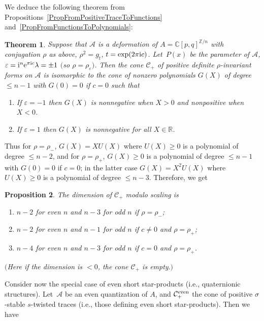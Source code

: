 \documentclass[pdftex]{sigma}
\newcommand{\RN}{\mathbb{R}} %
\newcommand{\CN}{\mathbb{C}} %
\newcommand{\mc}[1]{\mathcal{#1}}
\newtheorem{Theorem}{Theorem}[section]
\newtheorem{Proposition}[Theorem]{Proposition}
\theoremstyle{definition}
\numberwithin{equation}{section}
\begin{document}
We deduce the following theorem from Propositions~\ref{PropFromPositiveTraceToFunctions} and~\ref{PropFromFunctionsToPolynomials}:
\begin{Theorem}
\label{ThrPositiveFormSmallerThanOne}
Suppose that $\mc{A}$ is a deformation of $A=\CN[p,q]^{\mathbb Z/n}$ with conjugation $\rho$ as above, $\rho^2=g_t$, $t=\exp(2\pi {\rm i} c)$. Let~$P(x)$ be the parameter of $\mc{A}$, $\varepsilon={\rm i}^n{\rm e}^{\pi {\rm i}c}\lambda=\pm 1$ $($so $\rho=\rho_\varepsilon)$. Then the cone $\mc C_+$ of positive definite $\rho$-invariant forms on $\mc{A}$ is isomorphic to the cone of nonzero polynomials $G(X)$ of degree $\le n-1$ with $G(0)=0$ if $c=0$ such that
\begin{enumerate}\itemsep=0pt
\item[$1.$] If $\varepsilon=-1$ then $G(X)$ is nonnegative when $X>0$ and nonpositive when $X<0$.
\item[$2.$] If $\varepsilon=1$ then $G(X)$ is nonnegative for all $X\in \RN$.
\end{enumerate}
\end{Theorem}

Thus for $\rho=\rho_-$, $G(X)=XU(X)$ where $U(X)\ge 0$ is a polynomial of degree $\le n-2$, and for $\rho=\rho_+$, $G(X)\ge 0$ is a polynomial of degree $\le n-1$ with $G(0)=0$ if $c=0$; in the latter case $G(X)=X^2U(X)$ where $U(X)\ge 0$ is a polynomial of degree $\le n-3$. Therefore, we get

\begin{Proposition} The dimension of $\mc C_+$ modulo scaling is
\begin{enumerate}\itemsep=0pt
\item[$\bullet$] $n-2$ for even $n$ and $n-3$ for odd $n$ if $\rho=\rho_-$;

\item[$\bullet$] $n-2$ for even $n$ and $n-1$ for odd $n$ if $c\ne 0$ and $\rho=\rho_+$;

\item[$\bullet$] $n-4$ for even $n$ and $n-3$ for odd $n$ if $c=0$ and $\rho=\rho_+$.
\end{enumerate}
$($Here if the dimension is $<0$, the cone $\mc C_+$ is empty$.)$
\end{Proposition}

Consider now the special case of even short star-products (i.e., quaternionic structures). Let~$\mc A$ be an even quantization of $A$, and
$\mc C_+^{\rm even}$ the cone of positive $\sigma$-stable $s$-twisted traces (i.e., those defining even short star-products). Then we have
\end{document}
